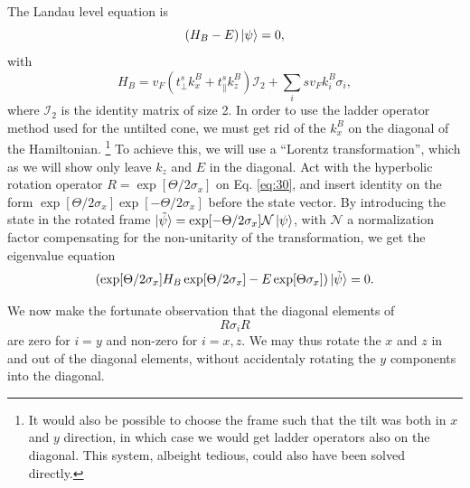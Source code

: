 The Landau level equation is
\begin{equation}
  \label{eq:30}
  \left(H_{B} - E\right) \ket{\psi } = 0,
\end{equation}
with
\begin{equation}
  \label{eq:31}
  H_{B} = v_F \left(t^s _{\perp} k^B_{x} + t^s _{\parallel} k^B_{z} \right) \mathcal{I}_2 + \sum_i s v_{F} k^B_{i} \sigma _{i},
\end{equation}
where \(\mathcal{I}_{2}\) is the identity matrix of size 2.
In order to use the ladder operator method used for the untilted cone, we must get rid of the \(k^B_{x}\) on the diagonal of the Hamiltonian.
\footnote{It would also be possible to choose the frame such that the tilt was both in \(x\) and \(y\) direction, in which case we would get ladder operators also on the diagonal.
  This system, albeight tedious, could also have been solved directly.
}
To achieve this, we will use a ``Lorentz transformation'', which as we will show only leave \(k_{z}\) and \(E\) in the diagonal.
Act with the hyperbolic rotation operator \(R = \exp[\Theta /2 \sigma_{x}]\) on Eq. \eqref{eq:30}, and insert identity on the form \(\exp[\Theta /2 \sigma_{x}]\exp[-\Theta /2 \sigma_{x}]\) before the state vector.
By introducing the state in the rotated frame \(\ket{\tilde{\psi}} = \exp[- \Theta /2 \sigma_{x}] \mathcal{N} \ket{\psi } \), with \(\mathcal{N}\) a normalization factor compensating for the non-unitarity of the transformation, we get the eigenvalue equation
\begin{equation}
  \label{eq:32}
  (\exp[\Theta /2 \sigma_{x}] H_{B}\exp[\Theta /2 \sigma_{x}] - E \exp[\Theta \sigma_{x}]) \ket{\tilde{\psi}} = 0.
\end{equation}

We now make the fortunate observation that the diagonal elements of
\[
  R \sigma_{i} R
\]
are zero for $i=y$ and non-zero for \(i=x,z\).
We may thus rotate the \(x\) and \(z\) in and out of the diagonal elements, without accidentaly rotating the \(y\) components into the diagonal.

